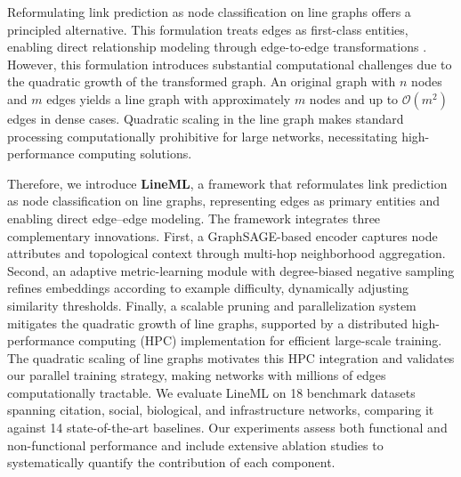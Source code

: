 \documentclass[pdflatex,sn-mathphys-num]{sn-jnl}%
\theoremstyle{thmstyleone}%
\theoremstyle{thmstyletwo}%
\theoremstyle{thmstylethree}%
\theoremstyle{plain} %
\theoremstyle{definition} %
\theoremstyle{remark} %
\theoremstyle{plain} %
\begin{document}
Reformulating link prediction as node classification on line graphs offers a principled alternative. 
This formulation treats edges as first-class entities, enabling direct relationship modeling through edge-to-edge transformations \cite{cai2021line,zhang2023line,liang2023line}. 
However, this formulation introduces substantial computational challenges due to the quadratic growth of the transformed graph.
An original graph with $n$ nodes and $m$ edges yields a line graph with approximately $m$ nodes and up to $\mathcal{O}(m^2)$ edges in dense cases.
Quadratic scaling in the line graph makes standard processing computationally prohibitive for large networks, necessitating high-performance computing solutions. 



Therefore, we introduce \textbf{LineML}, a framework that reformulates link prediction as node classification on line graphs, representing edges as primary entities and enabling direct edge–edge modeling. The framework integrates three complementary innovations. First, a GraphSAGE-based encoder captures node attributes and topological context through multi-hop neighborhood aggregation. Second, an adaptive metric-learning module with degree-biased negative sampling refines embeddings according to example difficulty, dynamically adjusting similarity thresholds. Finally, a scalable pruning and parallelization system mitigates the quadratic growth of line graphs, supported by a distributed high-performance computing (HPC) implementation for efficient large-scale training. The quadratic scaling of line graphs motivates this HPC integration and validates our parallel training strategy, making networks with millions of edges computationally tractable. We evaluate LineML on 18 benchmark datasets spanning citation, social, biological, and infrastructure networks, comparing it against 14 state-of-the-art baselines. Our experiments assess both functional and non-functional performance and include extensive ablation studies to systematically quantify the contribution of each component.
\end{document}
